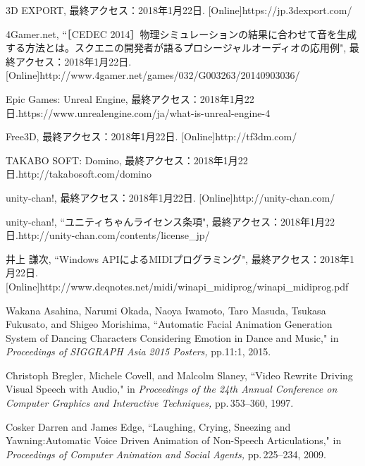 \renewcommand{\refname}{参考文献}	
%
\begin{thebibliography}{55}
%
3D EXPORT, 最終アクセス：2018年1月22日.
[Online]https://jp.3dexport.com/

4Gamer.net, ``［CEDEC 2014］物理シミュレーションの結果に合わせて音を生成する方法とは。スクエニの開発者が語るプロシージャルオーディオの応用例", 最終アクセス：2018年1月22日.
[Online]http://www.4gamer.net/games/032/G003263/20140903036/

Epic Games: Unreal Engine, 最終アクセス：2018年1月22日.\newline
[Online]https://www.unrealengine.com/ja/what-is-unreal-engine-4

Free3D, 最終アクセス：2018年1月22日.
[Online]http://tf3dm.com/

TAKABO SOFT: Domino, 最終アクセス：2018年1月22日.\newline
[Online]http://takabosoft.com/domino

unity-chan!, 最終アクセス：2018年1月22日.
[Online]http://unity-chan.com/

unity-chan!, ``ユニティちゃんライセンス条項", 最終アクセス：2018年1月22日.\newline
[Online]http://unity-chan.com/contents/license\_jp/

井上 謙次, ``Windows APIによるMIDIプログラミング", 最終アクセス：2018年1月22日.\,
[Online]http://www.deqnotes.net/midi/winapi\_midiprog/winapi\_midiprog.pdf

%

Wakana Asahina, Narumi Okada, Naoya Iwamoto, Taro Masuda, Tsukasa Fukusato, and Shigeo Morishima,
 ``Automatic Facial Animation Generation System of Dancing Characters Considering Emotion in Dance and Music,"
 in \textit{Proceedings of SIGGRAPH Asia 2015 Posters,} pp.11:1, 2015.

Christoph Bregler, Michele Covell, and Malcolm Slaney,
 ``Video Rewrite Driving Visual Speech with Audio,"
 in \textit{Proceedings of the 24th Annual Conference on Computer Graphics and Interactive Techniques,} pp.\,353--360, 1997.

Cosker Darren and James Edge,
 ``Laughing, Crying, Sneezing and Yawning:Automatic Voice Driven Animation of Non-Speech Articulations,"
 in \textit{Proceedings of Computer Animation and Social Agents,} pp.\,225--234, 2009.


\end{thebibliography}
